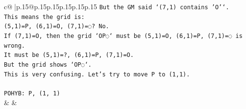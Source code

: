 \documentclass{article}
\begin{document}
{\begin{supertabular}{c@{$\;$}|p{.15\linewidth}@{}p{.15\linewidth}p{.15\linewidth}p{.15\linewidth}p{.15\linewidth}p{.15\linewidth}}
{{{\texttt{But the GM said `(7,1) contains 'O'`.} \\
\texttt{This means the grid is:} \\
\texttt{(5,1)=P, (6,1)=O, (7,1)=◌? No.} \\
\texttt{If (7,1)=O, then the grid `OP◌` must be (5,1)=O, (6,1)=P, (7,1)=◌ is wrong.} \\
\texttt{It must be (5,1)=?, (6,1)=P, (7,1)=O.} \\
\texttt{But the grid shows `OP◌`.} \\
\texttt{This is very confusing. Let's try to move P to (1,1).} \\
\\ 
\texttt{POHYB: P, (1, 1)} \\
            }
        }
    }
    & & \\ \\


\end{supertabular}}
\end{document}
